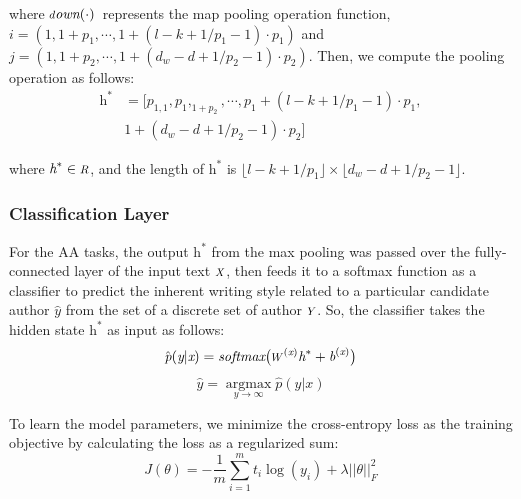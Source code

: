 \documentclass[conference]{IEEEtran}
\newcommand*{\Scale}[2][4]{\scalebox{#1}{$#2$}}%
\begin{document}
where $\textit{\Scale[0.8]down}{(\cdot)}$~represents the map pooling operation function, $i=(1,1+\textit{p}_1,\cdots,1+(l-k+{1}/{\textit{p}_{1}-1})\cdot \textit{p}_1)$ and $j=(1,1+\textit{p}_2,\cdots,1+(d_{w}-d+{1}/{\textit{p}_{2}-1})\cdot \textit{p}_2)$. Then, we compute the pooling operation as follows:
\setlength{\arraycolsep}{-2pt}
\begin{equation}\label{eqn10} 
\begin{split}
    \textit{h}^{\ast}&=[\textit{p}_{1,1},\textit{p}_{1},_{1+\textit{p}_{2}},\cdots,\textit{p}_{1}+ (l-k+1/\textit{p}_{1}-1)\cdot\textit{p}_{1},\\
    & 1+(d_{w}-d+1/\textit{p}_{2}-1)\cdot\textit{p}_{2}]
\end{split}
\end{equation}

where $\textit{h}^{\ast}\in\mathbb{\Scale[0.8]R}$, and the length of $\textit{h}^{\ast}$ is $\lfloor l-k+1/\textit{p}_1\rfloor\times\lfloor d_{w}-d+{1}/{\textit{p}_{2}-1} \rfloor$.

\subsubsection{Classification Layer}
For the AA tasks, the output $\textit{h}^{\ast}$ from the max pooling was passed over the fully-connected layer of the input text $\Scale[0.8]X$, then feeds it to a softmax function as a classifier to predict the inherent writing style related to a particular candidate author $\hat{\textit{y}}$ from the set of a discrete set of author $\textit{\Scale[0.8]Y}$. So, the classifier takes the hidden state $\textit{h}^{\ast}$ as input as follows:
\setlength{\arraycolsep}{-3pt}
\begin{equation}\label{eqn11}
         \hat{\textit{p}}(\textit{y}|\textit{x})=\emph{softmax}\big(\Scale[0.8]W^{(\textit{x})}\textit{h}^{\ast} + \textit{b}^{(\textit{x})}\big)
\end{equation}
\setlength{\arraycolsep}{-3pt}
\begin{equation}\label{eqn12}
  \hat{\textit{y}}=\operatorname*{argmax}_{y\to\infty}\hat{p}(y|x)
\end{equation}

To learn the model parameters, we minimize the cross-entropy loss as the training objective by calculating the loss as a regularized sum:
\setlength{\arraycolsep}{-3pt}
\begin{equation}\label{eqn13}
J{(\theta)}=-\frac{1}{m}\sum_{i=1}^{m}t_{i}\log(y_i)+\lambda||\theta||^{2}_{F}
\end{equation}
\end{document}
